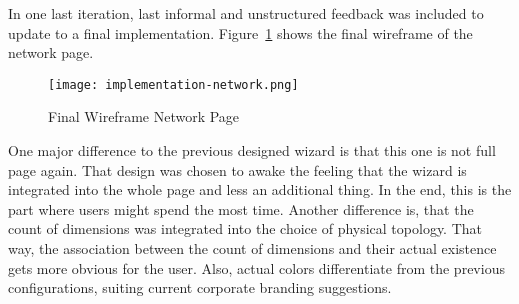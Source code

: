 In one last iteration, last informal and unstructured feedback was included to update to a final implementation. Figure~\ref{fig:wire-4} shows the final wireframe of the network page.

\begin{figure}[h]
    \centering
    \texttt{[image: implementation-network.png]}
    \caption{Final Wireframe Network Page}
    \label{fig:wire-4}
\end{figure}

One major difference to the previous designed wizard is that this one is not full page again. That design was chosen to awake the feeling that the wizard is integrated into the whole page and less an additional thing. In the end, this is the part where users might spend the most time.
Another difference is, that the count of dimensions was integrated into the choice of physical topology. That way, the association between the count of dimensions and their actual existence gets more obvious for the user. 
Also, actual colors differentiate from the previous configurations, suiting current corporate branding suggestions. 








